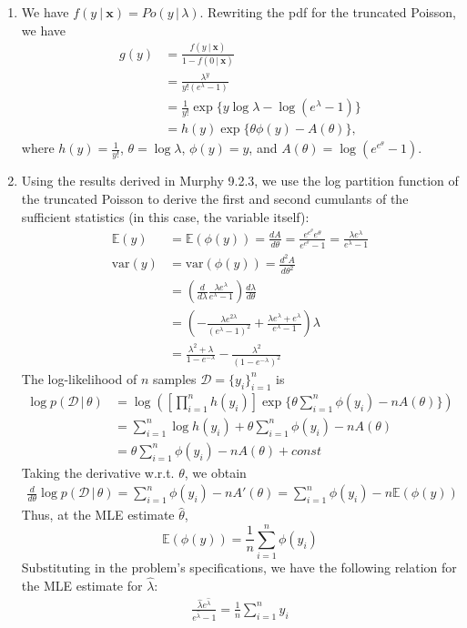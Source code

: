 \documentclass[submit]{harvardml}
\newcommand{\given}{\,|\,}
\newcommand{\E}{\mathbb{E}}
\newcommand{\var}{\text{var}}
\begin{document}
\begin{enumerate}[label=(\alph*)]
	\item We have $f(y\ |\ \mathbf{x}) = Po(y\given\lambda)$. Rewriting the pdf for the truncated Poisson, we have
	\begin{align*}
	g(y) &= \frac{f(y\ |\ \mathbf{x})}{1 - f(0\ | \ \mathbf{x})} \\
	&= \frac{\lambda^y}{y! (e^{\lambda} - 1)} \\
	&= \frac{1}{y!} \exp\{
	y\log\lambda - \log(e^{\lambda} - 1)
	\} \\
	&= h(y)\exp\{\theta \phi(y) - A(\theta)\},
	\end{align*}
	where $h(y) = \frac{1}{y!}$, $\theta = \log\lambda$, $\phi(y) = y$, and $A(\theta) = \log(e^{e^\theta} - 1)$.
	
	\item Using the results derived in Murphy 9.2.3, we use the log partition function of the truncated Poisson to derive the first and second cumulants of the sufficient statistics (in this case, the variable itself):
	\begin{align*}
	\E(y) &= \E(\phi(y)) = \frac{dA}{d\theta} 
	= \frac{e^{e^\theta} e^\theta}{e^{e^\theta} - 1} = \frac{\lambda e^{\lambda}}{e^{\lambda} - 1}
	\\
	\var(y) &= \var(\phi(y)) = \frac{d^2A}{d\theta^2} \\
	&= \left(\frac{d}{d\lambda} \frac{\lambda e^{\lambda}}{e^{\lambda} - 1}\right) \frac{d\lambda}{d\theta} \\
	&= \left(
	-\frac{\lambda e^{2\lambda}}{(e^{\lambda} - 1)^2}
	+ \frac{\lambda e^{\lambda} + e^{\lambda}}{e^{\lambda} - 1}
	\right) \lambda \\
	&=
	\frac{\lambda^2 + \lambda}{1 - e^{-\lambda}}
	- \frac{\lambda^2}{(1 - e^{-\lambda})^2}
	\end{align*}
	The log-likelihood of $n$ samples $\mathcal{D} = \{y_i\}_{i=1}^n$ is
	\begin{align*}
	\log p(\mathcal{D}\given\theta) 
	&= \log\left(
	\left[\prod_{i=1}^{n} h(y_i)\right]
	\exp\{\theta\sum_{i=1}^n\phi(y_i) - nA(\theta)\} 
	\right) \\
	&= \sum_{i=1}^{n} \log h(y_i)
	+ \theta\sum_{i=1}^n\phi(y_i) 
	- nA(\theta) \\
	&= \theta\sum_{i=1}^n\phi(y_i) - nA(\theta) + const
	\end{align*}
	Taking the derivative w.r.t. $\theta$, we obtain 
	\begin{align*}
	\frac{d}{d\theta} \log p(\mathcal{D}\given\theta) 
	= \sum_{i=1}^n\phi(y_i) - nA'(\theta)
	= \sum_{i=1}^n\phi(y_i) - n\E(\phi(y))
	\end{align*}
	Thus, at the MLE estimate $\hat{\theta}$, 
	\[
	\E(\phi(y)) = \frac{1}{n} \sum_{i=1}^n\phi(y_i)
	\]
	Substituting in the problem's specifications, we have the following relation for the MLE estimate for $\hat{\lambda}$:
	\begin{align*}
	\frac{\hat{\lambda} e^{\hat{\lambda}}}{e^{\hat{\lambda}} - 1}
	= \frac{1}{n} \sum_{i=1}^n y_i
	\end{align*}
	

\end{enumerate}
\end{document}
